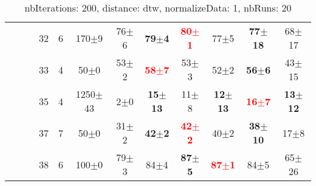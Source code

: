 \begin{table}
\begin{center}
\begin{tabular}{lllccccccccc}
 &  &  & 32 & 6 &     170$\pm$9 &  76$\pm$6 & \textbf{ 79$\pm$4} & \textbf{\textcolor{red}{ 80$\pm$1}} &  77$\pm$5 & \textbf{77$\pm$18} & 68$\pm$17 \\ 
 &  &  & 33 & 4 &      50$\pm$0 &  53$\pm$2 & \textbf{\textcolor{red}{ 58$\pm$7}} &  53$\pm$3 &  52$\pm$2 & \textbf{ 56$\pm$6} & 43$\pm$15 \\ 
 &  &  & 35 & 4 &   1250$\pm$43 &   2$\pm$0 & \textbf{15$\pm$13} &  11$\pm$8 & \textbf{12$\pm$13} & \textbf{\textcolor{red}{ 16$\pm$7}} & \textbf{13$\pm$12} \\ 
 &  &  & 37 & 7 &      50$\pm$0 &  31$\pm$2 & \textbf{ 42$\pm$2} & \textbf{\textcolor{red}{ 42$\pm$2}} &  40$\pm$2 & \textbf{38$\pm$10} &  17$\pm$8 \\ 
 &  &  & 38 & 6 &     100$\pm$0 &  79$\pm$3 &  84$\pm$4 & \textbf{ 87$\pm$5} & \textbf{\textcolor{red}{ 87$\pm$1}} &  84$\pm$5 & 65$\pm$26 \\ 
\end{tabular} 
\end{center} 
\caption{nbIterations: 200, distance: dtw, normalizeData: 1, nbRuns: 20} 
\label{nbit200DidtNoda1Nbru20} 
\end{table} 
 
